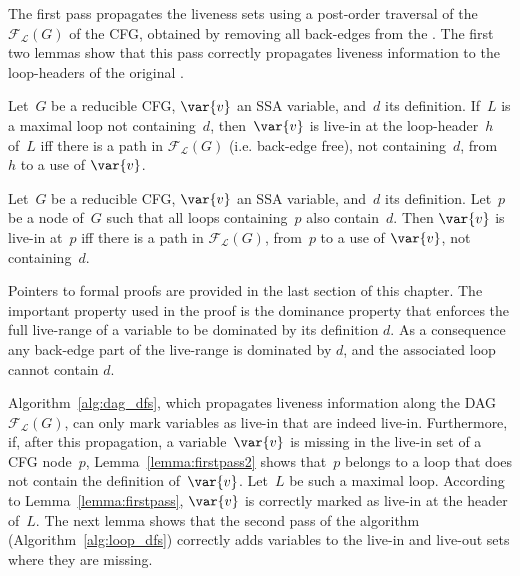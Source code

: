 The first pass propagates the liveness sets using a post-order traversal of the \reducedGraph\ $\mathcal{F}_\mathcal{L}(G)$ of the CFG, obtained by removing all back-edges from the \@CFG.
The first two lemmas show that this pass correctly propagates liveness information to the loop-headers of the original \@CFG.
\begin{lemma}
	\label{lemma:firstpass}
	Let~$G$ be a reducible CFG, $\var{v}$ an SSA variable, and~$d$ its definition.
	If~$L$ is a maximal loop not containing~$d$, then~$\var{v}$ is live-in at the loop-header~$h$ of~$L$ iff there is a path in $\mathcal{F}_\mathcal{L}(G)$ (i.e. back-edge free), not containing~$d$, from~$h$ to a use of $\var{v}$.
\end{lemma}

\begin{lemma}
	\label{lemma:firstpass2}
	Let~$G$ be a reducible CFG, $\var{v}$ an SSA variable, and~$d$ its definition.
	Let~$p$ be a node of~$G$ such that all loops containing~$p$ also contain~$d$.
	Then $\var{v}$ is live-in at~$p$ iff there is a path in $\mathcal{F}_\mathcal{L}(G)$, from~$p$ to a use of $\var{v}$, not containing~$d$.
\end{lemma}

Pointers to formal proofs are provided in the last section of this chapter.
The important property used in the proof is the dominance property that enforces the full live-range of a variable to be dominated by its definition $d$.
As a consequence any back-edge part of the live-range is dominated by $d$, and the associated loop cannot contain $d$.

Algorithm~\ref{alg:dag_dfs}, which propagates liveness information along the DAG $\mathcal{F}_\mathcal{L}(G)$, can only mark variables as live-in that are indeed live-in.
Furthermore, if, after this propagation, a variable~$\var{v}$ is missing in the live-in set of a CFG node~$p$, Lemma~\ref{lemma:firstpass2} shows that~$p$ belongs to a loop that does not contain the definition of~$\var{v}$.
Let~$L$ be such a maximal loop.
According to Lemma~\ref{lemma:firstpass}, $\var{v}$ is correctly marked as live-in at the header of~$L$.
The next lemma shows that the second pass of the algorithm (Algorithm~\ref{alg:loop_dfs}) correctly adds variables to the live-in and live-out sets where they are missing.

